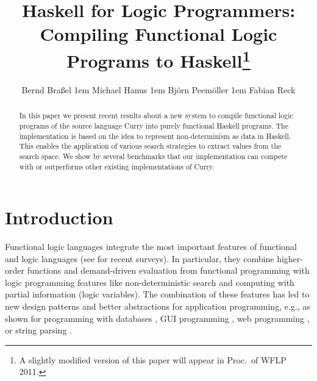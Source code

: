 \documentclass{llncs}
\begin{document}
\sloppy

\title{Haskell for Logic Programmers:\\
 Compiling Functional Logic Programs to Haskell\thanks{%
A slightly modified version of this paper will appear in
Proc.\ of WFLP 2011.}}


\author{
Bernd Bra{\ss}el
\kern1em
Michael Hanus
\kern1em
Bj{\"o}rn Peem{\"o}ller
\kern1em
Fabian Reck
}

\maketitle

\begin{abstract}
In this paper we present recent results about a new system to compile
functional logic programs of the source language Curry into purely
functional Haskell programs. The implementation is based on the idea
to represent non-determinism as data in Haskell. This enables the
application of various search strategies to extract values from the
search space. We show by several benchmarks that our implementation
can compete with or outperforms other existing implementations of
Curry.
\end{abstract}


\section{Introduction}
\label{sec:Introduction}

Functional logic languages integrate the most important
features of functional and logic languages
(see \cite{AntoyHanus10CACM,Hanus07ICLP} for recent surveys).
In particular, they combine higher-order functions and demand-driven
evaluation from functional programming with logic programming features
like non-deterministic search and computing with partial information
(logic variables).
The combination of these features
has led to new design patterns \cite{AntoyHanus02FLOPS,AntoyHanus11WFLP}
and better abstractions for application programming,
e.g., as shown for programming with databases
\cite{BrasselHanusMueller08PADL,Fischer05},
GUI programming \cite{Hanus00PADL},
web programming \cite{Hanus01PADL,Hanus06PPDP,HanusKoschnicke10PADL},
or string parsing \cite{CaballeroLopez99}.
\end{document}
